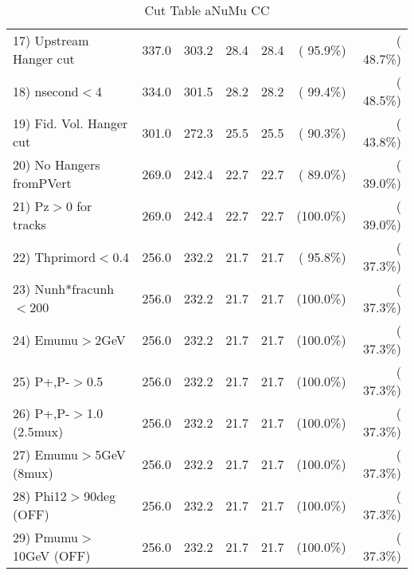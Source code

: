 \begin{table}[h!]
\begin{tabular}{||l||r|r|r|r|r|r||}
 17) Upstream Hanger cut  &        337.0 &        303.2 &         28.4 &         28.4 & ( 95.9\%) & ( 48.7\%) \\
 18) nsecond$<$4          &        334.0 &        301.5 &         28.2 &         28.2 & ( 99.4\%) & ( 48.5\%) \\
 19) Fid. Vol. Hanger cut &        301.0 &        272.3 &         25.5 &         25.5 & ( 90.3\%) & ( 43.8\%) \\
 20) No Hangers fromPVert &        269.0 &        242.4 &         22.7 &         22.7 & ( 89.0\%) & ( 39.0\%) \\
 21) Pz$>$0 for tracks    &        269.0 &        242.4 &         22.7 &         22.7 & (100.0\%) & ( 39.0\%) \\
 22) Thprimord$<$0.4      &        256.0 &        232.2 &         21.7 &         21.7 & ( 95.8\%) & ( 37.3\%) \\
 23) Nunh*fracunh$<$200   &        256.0 &        232.2 &         21.7 &         21.7 & (100.0\%) & ( 37.3\%) \\
 24) Emumu$>$2GeV         &        256.0 &        232.2 &         21.7 &         21.7 & (100.0\%) & ( 37.3\%) \\
 25) P+,P-$>$0.5          &        256.0 &        232.2 &         21.7 &         21.7 & (100.0\%) & ( 37.3\%) \\
 26) P+,P-$>$1.0 (2.5mux) &        256.0 &        232.2 &         21.7 &         21.7 & (100.0\%) & ( 37.3\%) \\
 27) Emumu$>$5GeV  (8mux) &        256.0 &        232.2 &         21.7 &         21.7 & (100.0\%) & ( 37.3\%) \\
 28) Phi12$>$90deg  (OFF) &        256.0 &        232.2 &         21.7 &         21.7 & (100.0\%) & ( 37.3\%) \\
 29) Pmumu$>$10GeV  (OFF) &        256.0 &        232.2 &         21.7 &         21.7 & (100.0\%) & ( 37.3\%) \\
 \hline
 \hline
 \end{tabular}
 \caption{Cut Table  aNuMu CC }
 \label{tab-cutcohjpsi-mumu_anumucc}
 \end{table}

